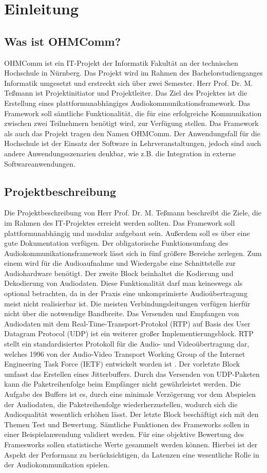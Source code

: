 \chapter{Einleitung}
\section{Was ist OHMComm?}
OHMComm ist ein IT-Projekt der Informatik Fakultät an der technischen Hochschule in Nürnberg. Das Projekt wird im Rahmen des Bachelorstudienganges Informatik umgesetzt und erstreckt sich über zwei Semester. Herr Prof. Dr. M. Teßmann ist Projektinitiator und Projektleiter. Das Ziel des Projektes ist die Erstellung eines plattformunabhängiges Audiokommunikationsframework. Das Framework soll sämtliche Funktionalität, die für eine erfolgreiche Kommunikation zwischen zwei Teilnehmern benötigt wird, zur Verfügung stellen. Das Framework als auch das Projekt tragen den Namen OHMComm. Der Anwendungsfall für die Hochschule ist der Einsatz der Software in Lehrveranstaltungen, jedoch sind auch andere Anwendungsszenarien denkbar, wie z.B. die Integration in externe Softwareanwendungen.

\section{Projektbeschreibung}
Die Projektbeschreibung von Herr Prof. Dr. M. Teßmann beschreibt die Ziele, die im Rahmen des IT-Projektes erreicht werden sollten. Das Framework soll plattformunabhängig und modular aufgebaut sein. Außerdem soll es über eine gute Dokumentation verfügen.
Der obligatorische Funktionsumfang des Audiokommunikationsframework lässt sich in fünf größere Bereiche zerlegen. 
Zum einem wird für die Audioaufnahme und Wiedergabe eine Schnittstelle zur Audiohardware benötigt. 
Der zweite Block beinhaltet die Kodierung und Dekodierung von Audiodaten. Diese Funktionalität darf man keineswegs als optional betrachten, da in der Praxis eine unkomprimierte Audioübertragung meist nicht realisierbar ist. Die meisten Verbindungsleitungen verfügen hierfür nicht über die notwendige Bandbreite. 
Das Versenden und Empfangen von Audiodaten mit dem Real-Time-Transport-Protokol (RTP) auf Basis des User Datagram Protocol (UDP) ist ein weiterer großer Implementierungsblock. RTP stellt ein standardisiertes Protokoll für die Audio- und Videoübertragung dar, welches 1996 von der Audio-Video Transport Working Group of the Internet Engineering Task Force (IETF) entwickelt worden ist \cite{RFC3550}. 
Der vorletzte Block umfasst das Erstellen eines Jitterbuffers. Durch das Versenden von UDP-Paketen kann die Paketreihenfolge beim Empfänger nicht gewährleistet werden. Die Aufgabe des Buffers ist es, durch eine minimale Verzögerung vor dem Abspielen der Audiodaten, die Paketreihenfolge wiederherzustellen, wodurch sich die Audioqualität wesentlich erhöhen lässt.
Der letzte Block beschäftigt sich mit den Themen Test und Bewertung. Sämtliche Funktionen des Frameworks sollen in einer Beispielanwendung validiert werden. Für eine objektive Bewertung des Framesworks sollen statistische Werte gesammelt werden können. Hierbei ist der Aspekt der Performanz zu berücksichtigen, da Latenzen eine wesentliche Rolle in der Audiokommunikation spielen.
	
